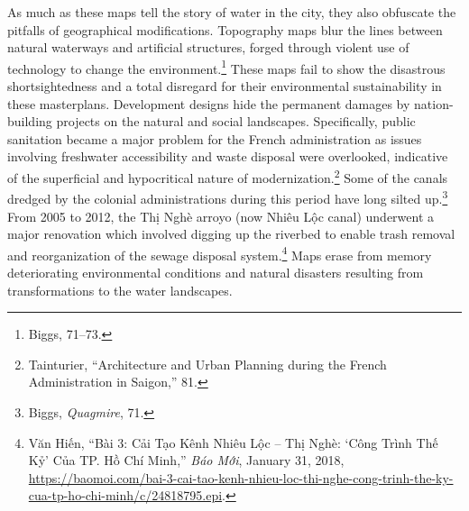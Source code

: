 As much as these maps tell the story of water in the city, they also obfuscate the pitfalls of geographical modifications. Topography maps blur the lines between natural waterways and artificial structures, forged through violent use of technology to change the environment.\footnote{Biggs, 71–73.} These maps fail to show the disastrous shortsightedness and a total disregard for their environmental sustainability in these masterplans. Development designs hide the permanent damages by nation-building projects on the natural and social landscapes. Specifically, public sanitation became a major problem for the French administration as issues involving freshwater accessibility and waste disposal were overlooked, indicative of the superficial and hypocritical nature of modernization.\footnote{Tainturier, “Architecture and Urban Planning during the French Administration in Saigon,” 81.} Some of the canals dredged by the colonial administrations during this period have long silted up.\footnote{Biggs, \textit{Quagmire}, 71.} From 2005 to 2012, the Thị Nghè arroyo (now Nhiêu Lộc canal) underwent a major renovation which involved digging up the riverbed to enable trash removal and reorganization of the sewage disposal system.\footnote{Văn Hiến, “Bài 3: Cải Tạo Kênh Nhiêu Lộc – Thị Nghè: ‘Công Trình Thế Kỷ’ Của TP. Hồ Chí Minh,” \textit{Báo Mới}, January 31, 2018, \url{https://baomoi.com/bai-3-cai-tao-kenh-nhieu-loc-thi-nghe-cong-trinh-the-ky-cua-tp-ho-chi-minh/c/24818795.epi}.} Maps erase from memory deteriorating environmental conditions and natural disasters resulting from transformations to the water landscapes.


